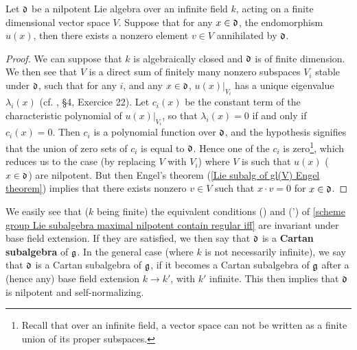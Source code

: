 \begin{lemma}\label{scheme group Lie algebra nilpotent acting noninjective prop}
Let $\mathfrak{d}$ be a nilpotent Lie algebra over an infinite field $k$, acting on a finite dimensional vector space $V$. Suppose that for any $x\in\mathfrak{d}$, the endomorphism $u(x)$, then there exists a nonzero element $v\in V$ annihilated by $\mathfrak{d}$.
\end{lemma}
\begin{proof}
We can suppose that $k$ is algebraically closed and $\mathfrak{d}$ is of finite dimension. We then see that $V$ is a direct sum of finitely many nonzero subspaces $V_i$ stable under $\mathfrak{d}$, such that for any $i$, and any $x\in\mathfrak{d}$, $u(x)|_{V_i}$ has a unique eigenvalue $\lambda_i(x)$ (cf. \cite{Borubaki_LieI} , \S 4, Exercice 22). Let $c_i(x)$ be the constant term of the characteristic polynomial of $u(x)|_{V_i}$, so that $\lambda_i(x)=0$ if and only if $c_i(x)=0$. Then $c_i$ is a polynomial function over $\mathfrak{d}$, and the hypothesis signifies that the union of zero sets of $c_i$ is equal to $\mathfrak{d}$. Hence one of the $c_i$ is zero\footnote{Recall that over an infinite field, a vector space can not be written as a finite union of its proper subspaces.}, which reduces us to the case (by replacing $V$ with $V_i$) where $V$ is such that $u(x)$ ($x\in\mathfrak{d}$) are nilpotent. But then Engel's theorem (\cref{Lie subalg of gl(V) Engel theorem}) implies that there exists nonzero $v\in V$ such that $x\cdot v=0$ for $x\in\mathfrak{d}$.
\end{proof}

We easily see that ($k$ being finite) the equivalent conditions () and (') of \cref{scheme group Lie subalgebra maximal nilpotent contain regular iff} are invariant under base field extension. If they are satisfied, we then say that $\mathfrak{d}$ is a \textbf{Cartan subalgebra} of $\mathfrak{g}$. In the general case (where $k$ is not necessarily infinite), we say that $\mathfrak{d}$ is a Cartan subalgebra of $\mathfrak{g}$, if it becomes a Cartan subalgebra of $\mathfrak{g}$ after a (hence any) base field extension $k\to k'$, with $k'$ infinite. This then implies that $\mathfrak{d}$ is nilpotent and self-normalizing.

